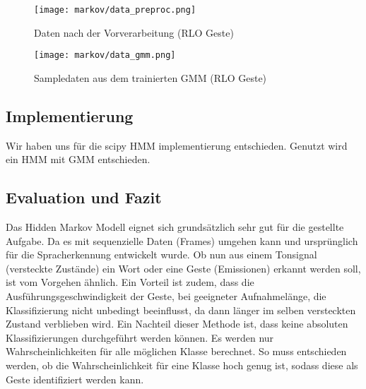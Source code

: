 \begin{figure}[htbp] \centering
    \texttt{[image: markov/data\_preproc.png]}
    \caption{Daten nach der Vorverarbeitung (\acl{RLO} Geste)}
    \label{fig:data_preproc}
\end{figure}

\begin{figure}[htbp] \centering
    \texttt{[image: markov/data\_gmm.png]}
    \caption{Sampledaten aus dem trainierten \acl{GMM} (\acl{RLO} Geste)}
    \label{fig:data_gmm}
\end{figure}

\subsection{Implementierung}  \label{sec:impl}
Wir haben uns für die scipy HMM implementierung entschieden. 
Genutzt wird ein \acl{HMM} mit \acl{GMM} entschieden.


\subsection{Evaluation und Fazit}  \label{sec:result}
Das Hidden Markov Modell eignet sich grundsätzlich sehr gut für die gestellte Aufgabe. Da es mit sequenzielle Daten (Frames) umgehen 
kann und ursprünglich für die Spracherkennung entwickelt wurde. Ob nun aus einem Tonsignal (versteckte Zustände) ein Wort oder 
eine Geste (Emissionen) erkannt werden soll, ist vom Vorgehen ähnlich. Ein Vorteil ist zudem, dass die Ausführungsgeschwindigkeit
 der Geste, bei geeigneter Aufnahmelänge, die Klassifizierung nicht unbedingt beeinflusst, da dann länger im selben versteckten 
 Zustand verblieben wird.
Ein Nachteil dieser Methode ist, dass keine absoluten Klassifizierungen durchgeführt werden können. Es werden nur Wahrscheinlichkeiten für alle möglichen Klasse berechnet. So muss entschieden werden, ob die Wahrscheinlichkeit für eine Klasse hoch genug ist, sodass diese als Geste identifiziert werden kann.
